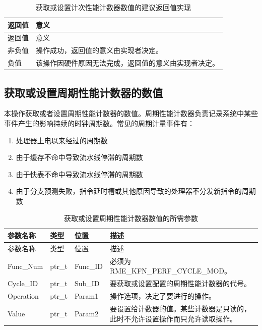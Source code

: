 \begin{xltabular}{\textwidth}{@{}>{\hsize\raggedright\arraybackslash}X>{\hsize\raggedright\arraybackslash}X@{}}
\caption{获取或设置计次性能计数器数值的建议返回值实现}\label{tab:8-63-get-or-set-count-performance-counter-suggested-return-values}\\
\toprule
返回值 & 意义\tabularnewline
\endfirsthead
\toprule
返回值 & 意义\tabularnewline
\midrule
\endhead
\bottomrule
\endlastfoot
    非负值 & 操作成功，返回值的意义由实现者决定。\tabularnewline
    负值 & 该操作因硬件原因无法完成，返回值的意义由实现者决定。\tabularnewline
\end{xltabular}

\subsection{获取或设置周期性能计数器的数值}\label{subsec:8-get-or-set-cycle-performance-counter}

本操作获取或者设置周期性能计数器的数值。周期性能计数器负责记录系统中某些事件产生的影响持续的时钟周期数。常见的周期计量事件有：

\begin{enumerate}
\def\labelenumi{\arabic{enumi}.}
\item
  处理器上电以来经过的周期数
\item
  由于缓存不命中导致流水线停滞的周期数
\item
  由于快表不命中导致流水线停滞的周期数
\item
  由于分支预测失败，指令延时槽或其他原因导致的处理器不分发新指令的周期数
\end{enumerate}

\begin{xltabular}{\textwidth}{@{}>{\hsize\raggedright\arraybackslash}X>{\hsize\raggedright\arraybackslash}X>{\hsize\raggedright\arraybackslash}X>{\hsize\raggedright\arraybackslash}X@{}}
\caption{获取或设置周期性能计数器数值的所需参数}\label{tab:8-64-get-or-set-cycle-performance-counter-parameters}\\
\toprule
参数名称 & 类型 & 位置 & 描述\tabularnewline
\endfirsthead
\toprule
参数名称 & 类型 & 位置 & 描述\tabularnewline
\midrule
\endhead
\bottomrule
\endlastfoot
Func\_Num & ptr\_t & Func\_ID & 必须为 RME\_KFN\_PERF\_CYCLE\_MOD。\tabularnewline
Cycle\_ID & ptr\_t & Sub\_ID &
要获取或设置配置的周期性能计数器的代号。\tabularnewline
Operation & ptr\_t & Param1 &
操作选项，决定了要进行的操作。\tabularnewline
Value & ptr\_t & Param2 &
要设置给计数器的值。某些计数器是只读的，此时不允许设置操作而只允许读取操作。\tabularnewline
\end{xltabular}

